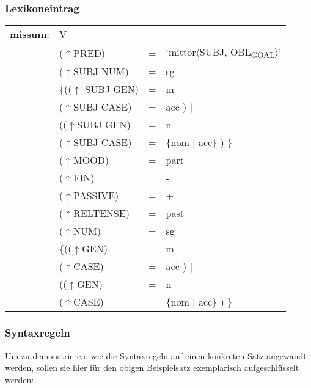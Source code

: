 \documentclass[12pt,a4paper]{article}
\begin{document}
\subsubsection{Lexikoneintrag}
\begin{singlespace}
\begin{tabular}{ l  l  l  l  } 
\textbf{missum}: & \: V \\
$\qquad$ & \:  ($\uparrow$PRED) & = & `mittor$\langle$SUBJ, OBL\textsubscript{GOAL}$\rangle$'\\
$\qquad$ & \:  ($\uparrow$SUBJ NUM) & =  & sg \\
$\qquad$ & \:  \{(($\uparrow$ SUBJ GEN) & = & m \\ 
$\qquad$ & \: \: \: ($\uparrow$SUBJ CASE) & = & acc ) $\mid$\\
$\qquad$ & \: \: (($\uparrow$SUBJ GEN) & = & n \\
$\qquad$ & \: \: \: ($\uparrow$SUBJ CASE) & = & \{nom $\mid$ acc\} ) \}\\
$\qquad$ & \:  ($\uparrow$MOOD) & = & part\\
$\qquad$ & \:  ($\uparrow$FIN) & = & - \\
$\qquad$ & \:  ($\uparrow$PASSIVE) & = & + \\
$\qquad$ & \:  ($\uparrow$RELTENSE) & = & past \\
$\qquad$ & \:  ($\uparrow$NUM) & = & sg \\
$\qquad$ & \:  \{(($\uparrow$GEN) & = & m \\ 
$\qquad$ & \: \: \: ($\uparrow$CASE) & = & acc ) $\mid$\\
$\qquad$ & \: \: (($\uparrow$GEN) & = & n \\
$\qquad$ & \: \: \: ($\uparrow$CASE) & = & \{nom $\mid$ acc\} ) \}\\
\end{tabular}
\newline
\newline
\end{singlespace}


\subsubsection{Syntaxregeln}
Um zu demonstrieren, wie die Syntaxregeln auf einen konkreten Satz angewandt werden, sollen sie hier für den obigen Beispielsatz exemplarisch aufgeschlüsselt werden: \\
\end{document}
